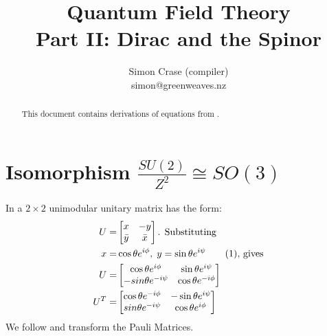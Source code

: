 \documentclass[]{article}
\title{Quantum Field Theory\\
Part II: Dirac and the Spinor}
\author{Simon Crase (compiler)\\simon@greenweaves.nz}
\newcommand\numberthis{\addtocounter{equation}{1}\tag{\theequation}}
\begin{document}
\maketitle

\begin{abstract}

This document contains derivations of equations from \cite[Part II: Dirac and the Spinor]{zee2010quantum}.

\end{abstract}

\tableofcontents
\section{Isomorphism $\frac{SU(2)}{Z^2} \cong SO(3)$}
In \cite[Section 3]{westra2008SU2} a $2\times 2$ unimodular unitary matrix has the form:
\begin{align*}
	U =& \begin{bmatrix}
		x&-y\\
		\bar{y}&\bar{x}
	\end{bmatrix} \text{. Substituting}\\
	x =& \cos{\theta} e^{i\phi}, \; y = \sin{\theta} e^{i\psi} \numberthis \label{eq:xy} \text{, gives} \\
	U=& \begin{bmatrix}
		\cos{\theta} e^{i\phi}&\sin{\theta}e^{i\psi}\\
		-sin{\theta}e^{-i\psi}&\cos{\theta} e^{-i\phi}
	\end{bmatrix}\\
	U^T =& \begin{bmatrix}
		\cos{\theta} e^{-i\phi}&-\sin{\theta}e^{i\psi}\\
		sin{\theta}e^{-i\psi}&\cos{\theta} e^{i\phi}
	\end{bmatrix}
\end{align*}
We follow \cite[Section 4]{westra2008SU2} and transform the Pauli Matrices.
\end{document}
